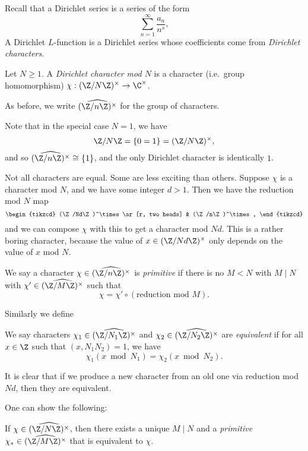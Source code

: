 \documentclass[a4paper]{article}
\begin{document}
Recall that a Dirichlet series is a series of the form
\[
  \sum_{n = 1}^\infty \frac{a_n}{n^s},
\]
A Dirichlet $L$-function is a Dirichlet series whose coefficients come from \emph{Dirichlet characters}.

\begin{defi}
  Let $N \geq 1$. A \emph{Dirichlet character mod $N$} is a character (i.e.\ group homomorphism) $\chi: (\Z/N\Z)^\times \to \C^\times$.

  As before, we write $\widehat{(\Z/n\Z)^\times}$ for the group of characters.
\end{defi}
Note that in the special case $N = 1$, we have
\[
  \Z/N\Z = \{0 = 1\} = (\Z/N\Z)^\times,
\]
and so $\widehat{(\Z/n\Z)^\times} \cong \{1\}$, and the only Dirichlet character is identically $1$.

Not all characters are equal. Some are less exciting than others. Suppose $\chi$ is a character mod $N$, and we have some integer $d > 1$. Then we have the reduction mod $N$ map
\[
  \begin{tikzcd}
    (\Z/Nd\Z)^\times \ar[r, two heads] & (\Z/n\Z)^\times,
  \end{tikzcd}
\]
and we can compose $\chi$ with this to get a character mod $Nd$. This is a rather boring character, because the value of $x \in (\Z/Nd\Z)^\times$ only depends on the value of $x$ mod $N$.
\begin{defi}
  We say a character $\chi \in \widehat{(\Z/n\Z)^\times}$ is \emph{primitive} if there is no $M < N$ with $M \mid N$ with $\chi' \in \widehat{(\Z/M\Z)^\times}$ such that
  \[
    \chi = \chi' \circ (\text{reduction mod $M$}).
  \]
\end{defi}

Similarly we define
\begin{defi}
  We say characters $\chi_1 \in \widehat{(\Z/N_1\Z)^\times}$ and $\chi_2 \in \widehat{(\Z/N_2\Z)^\times}$ are \emph{equivalent} if for all $x \in \Z$ such that $(x, N_1 N_2) = 1$, we have
  \[
    \chi_1(x \bmod N_1) = \chi_2(x \bmod N_2).
  \]
\end{defi}
It is clear that if we produce a new character from an old one via reduction mod $Nd$, then they are equivalent.

One can show the following:
\begin{prop}
  If $\chi \in \widehat{(\Z/N\Z)^\times}$, then there exists a unique $M \mid N$ and a \emph{primitive} $\chi_* \in \widehat{(\Z/M\Z)^\times}$ that is equivalent to $\chi$.
\end{prop}
\end{document}
